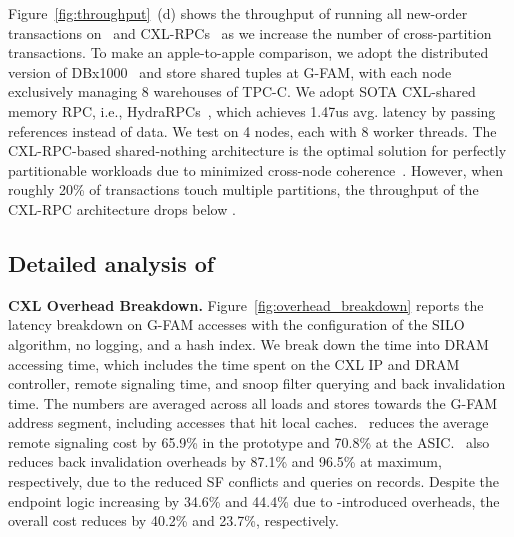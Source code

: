 Figure~\ref{fig:throughput}~(d) shows the throughput of running all new-order transactions on \name~and CXL-RPCs~\cite{hydrarpc_atc24, partial_sosp23} as we increase the number of cross-partition transactions. To make an apple-to-apple comparison, we adopt the distributed version of DBx1000~\cite{dbx1000_dist_vldb17} and store shared tuples at G-FAM, with each node exclusively managing 8 warehouses of TPC-C. We adopt SOTA CXL-shared memory RPC, i.e., HydraRPCs~\cite{hydrarpc_atc24}, which achieves 1.47us avg. latency by passing references instead of data. 
We test on 4 nodes, each with 8 worker threads. The CXL-RPC-based shared-nothing architecture is the optimal solution for perfectly partitionable workloads due to minimized cross-node coherence~\cite{hekaton_sigmod13}. However, when roughly 20\% of transactions touch multiple partitions, the throughput of the CXL-RPC architecture drops below \name.




\subsection{Detailed analysis of \name}

\noindent \textbf{CXL Overhead Breakdown.} Figure~\ref{fig:overhead_breakdown} reports the latency breakdown on G-FAM accesses with the configuration of the SILO algorithm, no logging, and a hash index. We break down the time into DRAM accessing time, which includes the time spent on the CXL IP and DRAM controller, remote signaling time, and snoop filter querying and back invalidation time. 
The numbers are averaged across all loads and stores towards the G-FAM address segment, including accesses that hit local caches. 
\name~reduces the average remote signaling cost by 65.9\% in the prototype and 70.8\% at the ASIC. 
\name~also reduces back invalidation overheads by 87.1\% and 96.5\% at maximum, respectively, due to the reduced SF conflicts and queries on records. 
Despite the endpoint logic increasing by 34.6\% and 44.4\% due to \name-introduced overheads, the overall cost reduces by 40.2\% and 23.7\%, respectively. 


